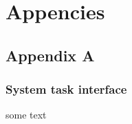 
\chapter{Appencies}
\section{Appendix A}

\subsection{System task interface}
some text
    
    
    